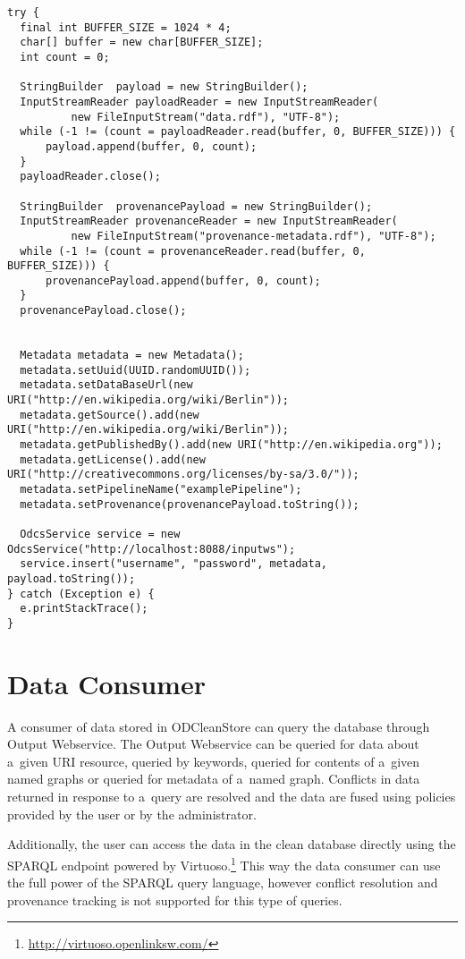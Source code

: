 \begin{lstlisting}[caption={Example usage of Input Webservice client library},label=lst:clientLibrary]
try {
  final int BUFFER_SIZE = 1024 * 4;
  char[] buffer = new char[BUFFER_SIZE];
  int count = 0;

  StringBuilder  payload = new StringBuilder();
  InputStreamReader payloadReader = new InputStreamReader(
          new FileInputStream("data.rdf"), "UTF-8");
  while (-1 != (count = payloadReader.read(buffer, 0, BUFFER_SIZE))) {
      payload.append(buffer, 0, count);
  }
  payloadReader.close();

  StringBuilder  provenancePayload = new StringBuilder();
  InputStreamReader provenanceReader = new InputStreamReader(
          new FileInputStream("provenance-metadata.rdf"), "UTF-8");
  while (-1 != (count = provenanceReader.read(buffer, 0, BUFFER_SIZE))) {
      provenancePayload.append(buffer, 0, count);
  }
  provenancePayload.close();


  Metadata metadata = new Metadata();
  metadata.setUuid(UUID.randomUUID());
  metadata.setDataBaseUrl(new URI("http://en.wikipedia.org/wiki/Berlin"));
  metadata.getSource().add(new URI("http://en.wikipedia.org/wiki/Berlin"));
  metadata.getPublishedBy().add(new URI("http://en.wikipedia.org"));
  metadata.getLicense().add(new URI("http://creativecommons.org/licenses/by-sa/3.0/")); 
  metadata.setPipelineName("examplePipeline"); 
  metadata.setProvenance(provenancePayload.toString()); 

  OdcsService service = new OdcsService("http://localhost:8088/inputws");
  service.insert("username", "password", metadata, payload.toString());
} catch (Exception e) {
  e.printStackTrace();
}
\end{lstlisting}

\section{Data Consumer}
\label{sec:outputWS}

A consumer of data stored in ODCleanStore can query the database through Output Webservice. The Output Webservice can be queried for data about a~given URI resource, queried by keywords, queried for contents of a~given named graphs or queried for metadata of a~named graph. Conflicts in data returned in response to a~query are resolved and the data are fused using policies provided by the user or by the administrator.

Additionally, the user can access the data in the clean database directly using the SPARQL endpoint powered by Virtuoso.\footnote{\url{http://virtuoso.openlinksw.com/}} This way the data consumer can use the full power of the SPARQL query language, however conflict resolution and provenance tracking is not supported for this type of queries.

